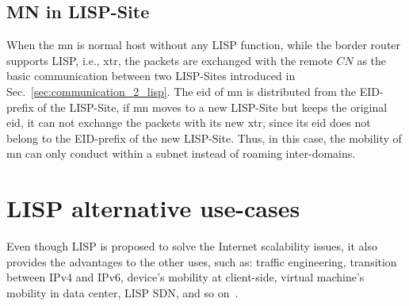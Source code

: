 \subsection{MN in LISP-Site}
\label{subsec:MN_LS}
When the \acrshort{mn} is normal host without any LISP function, while the border router supports LISP, i.e., \acrshort{xtr}, the packets are exchanged with the remote $CN$ as the basic communication between two LISP-Sites introduced in Sec.~\ref{sec:communication_2_lisp}. The \acrshort{eid} of \acrshort{mn} is distributed from the EID-prefix of the LISP-Site, if \acrshort{mn} moves to a new LISP-Site but keeps the original \acrshort{eid}, it can not exchange the packets with its new \acrshort{xtr}, since its \acrshort{eid} does not belong to the EID-prefix of the new LISP-Site. Thus, in this case, the mobility of \acrshort{mn} can only conduct within a subnet instead of roaming inter-domains.




\section{LISP alternative use-cases}
\label{subsec:studies_usecase}
Even though LISP is proposed to solve the Internet scalability issues, it also provides the advantages to the other uses, such as: traffic engineering, transition between IPv4 and IPv6, device's mobility at client-side, virtual machine's mobility in data center, LISP SDN, and so on~\cite{rfc7834}. 

